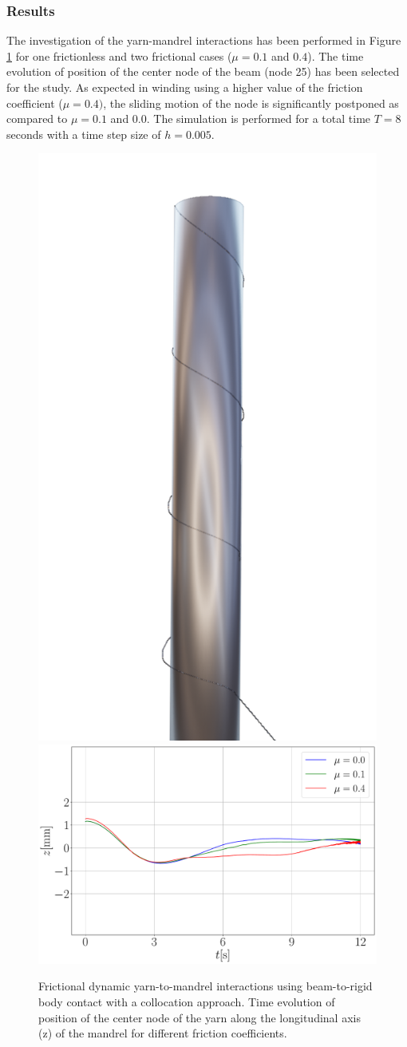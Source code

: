 \subsubsection{Results}
The investigation of the yarn-mandrel interactions has been performed in Figure \ref{fig:fricvalues} for one frictionless and two frictional cases ($\mu = 0.1$ and $0.4$). The time evolution of position of the center node of the beam (node 25) has been selected for the study. As expected in winding using a higher value of the friction coefficient ($\mu = 0.4)$, the sliding motion of the node is significantly postponed as compared to $\mu = 0.1$ and $0.0$. The simulation is performed for a total time $T = 8$ seconds with a time step size of $h = 0.005$.

\begin{figure}[h]
\centering
  \centering
  \includegraphics[width=0.27\linewidth]{figures/steel_mandrel_1.png}\\
  \centering
  \includegraphics[width=0.47\linewidth]{figures/mu_compare.pdf}
\caption{Frictional dynamic yarn-to-mandrel interactions using beam-to-rigid body contact with a collocation approach. Time evolution of position of the center node of the yarn along the longitudinal axis (z) of the mandrel for different friction coefficients.}
\label{fig:fricvalues}
\end{figure}



















